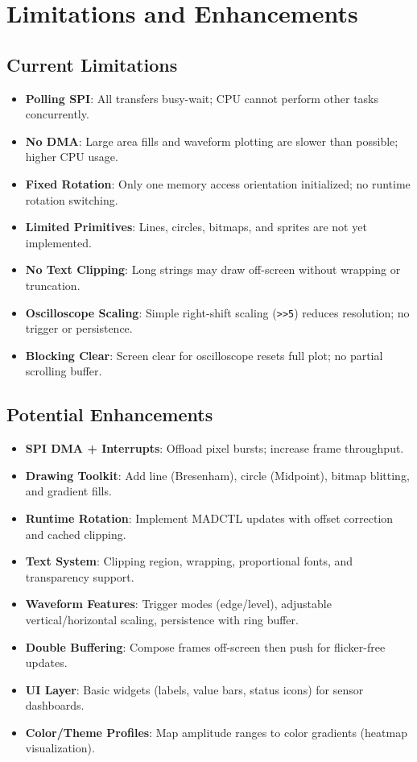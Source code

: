 \documentclass[pdflatex,sn-mathphys-num]{sn-jnl}%
\begin{document}
\section{Limitations and Enhancements}
\subsection{Current Limitations}
\begin{itemize}
    \item \textbf{Polling SPI}: All transfers busy-wait; CPU cannot perform other tasks concurrently.
    \item \textbf{No DMA}: Large area fills and waveform plotting are slower than possible; higher CPU usage.
    \item \textbf{Fixed Rotation}: Only one memory access orientation initialized; no runtime rotation switching.
    \item \textbf{Limited Primitives}: Lines, circles, bitmaps, and sprites are not yet implemented.
    \item \textbf{No Text Clipping}: Long strings may draw off-screen without wrapping or truncation.
    \item \textbf{Oscilloscope Scaling}: Simple right-shift scaling (\verb|>>5|) reduces resolution; no trigger or persistence.
    \item \textbf{Blocking Clear}: Screen clear for oscilloscope resets full plot; no partial scrolling buffer.
\end{itemize}

\subsection{Potential Enhancements}
\begin{itemize}
    \item \textbf{SPI DMA + Interrupts}: Offload pixel bursts; increase frame throughput.
    \item \textbf{Drawing Toolkit}: Add line (Bresenham), circle (Midpoint), bitmap blitting, and gradient fills.
    \item \textbf{Runtime Rotation}: Implement MADCTL updates with offset correction and cached clipping.
    \item \textbf{Text System}: Clipping region, wrapping, proportional fonts, and transparency support.
    \item \textbf{Waveform Features}: Trigger modes (edge/level), adjustable vertical/horizontal scaling, persistence with ring buffer.
    \item \textbf{Double Buffering}: Compose frames off-screen then push for flicker-free updates.
    \item \textbf{UI Layer}: Basic widgets (labels, value bars, status icons) for sensor dashboards.
    \item \textbf{Color/Theme Profiles}: Map amplitude ranges to color gradients (heatmap visualization).
\end{itemize}
\end{document}
